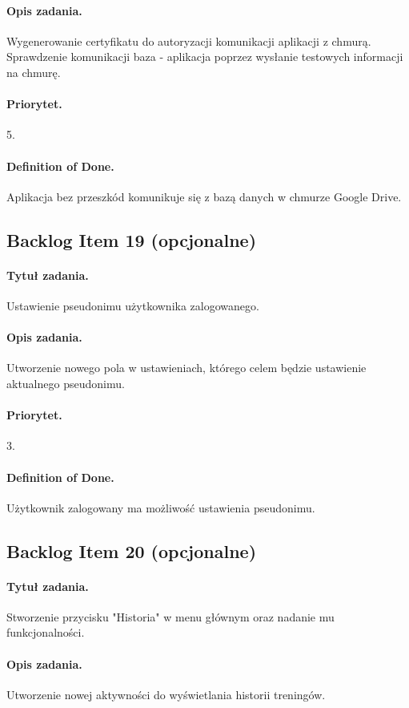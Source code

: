 \documentclass[a4paper]{article}
\begin{document}
\paragraph{Opis zadania.} Wygenerowanie certyfikatu do autoryzacji komunikacji aplikacji z chmurą. Sprawdzenie komunikacji baza - aplikacja poprzez wysłanie testowych informacji na chmurę.
\paragraph{Priorytet.} 5.
\paragraph{Definition of Done.} Aplikacja bez przeszkód komunikuje się z bazą danych w chmurze Google Drive.

\subsection{Backlog Item 19 (opcjonalne)}
\paragraph{Tytuł zadania.} Ustawienie pseudonimu użytkownika zalogowanego.
\paragraph{Opis zadania.} Utworzenie nowego pola w ustawieniach, którego celem będzie ustawienie aktualnego pseudonimu.
\paragraph{Priorytet.} 3.
\paragraph{Definition of Done.} Użytkownik zalogowany ma możliwość ustawienia pseudonimu.

\subsection{Backlog Item 20 (opcjonalne)}
\paragraph{Tytuł zadania.} Stworzenie przycisku "Historia" w menu głównym oraz nadanie mu funkcjonalności.
\paragraph{Opis zadania.} Utworzenie nowej aktywności do wyświetlania historii treningów.
\end{document}
